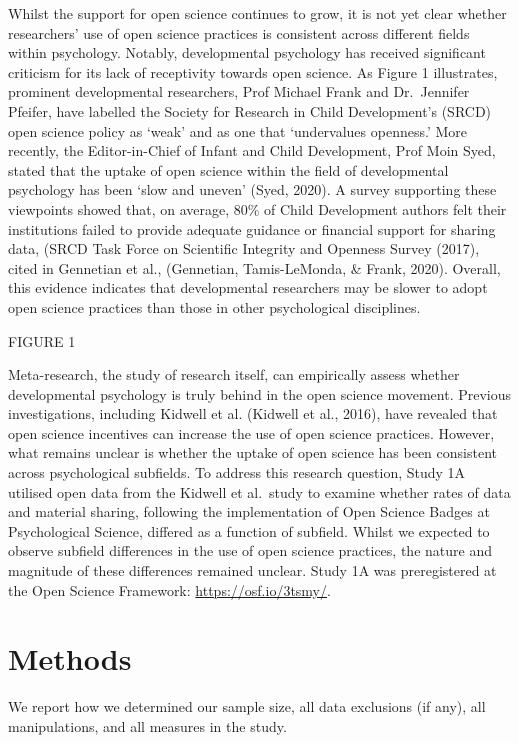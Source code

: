 \documentclass[
  english,
  man]{apa6}
\begin{document}
Whilst the support for open science continues to grow, it is not yet clear whether researchers' use of open science practices is consistent across different fields within psychology. Notably, developmental psychology has received significant criticism for its lack of receptivity towards open science. As Figure 1 illustrates, prominent developmental researchers, Prof Michael Frank and Dr.~Jennifer Pfeifer, have labelled the Society for Research in Child Development's (SRCD) open science policy as `weak' and as one that `undervalues openness.' More recently, the Editor-in-Chief of Infant and Child Development, Prof Moin Syed, stated that the uptake of open science within the field of developmental psychology has been `slow and uneven' (Syed, 2020). A survey supporting these viewpoints showed that, on average, 80\% of Child Development authors felt their institutions failed to provide adequate guidance or financial support for sharing data, (SRCD Task Force on Scientific Integrity and Openness Survey (2017), cited in Gennetian et al., (Gennetian, Tamis-LeMonda, \& Frank, 2020). Overall, this evidence indicates that developmental researchers may be slower to adopt open science practices than those in other psychological disciplines.

FIGURE 1

Meta-research, the study of research itself, can empirically assess whether developmental psychology is truly behind in the open science movement. Previous investigations, including Kidwell et al. (Kidwell et al., 2016), have revealed that open science incentives can increase the use of open science practices. However, what remains unclear is whether the uptake of open science has been consistent across psychological subfields. To address this research question, Study 1A utilised open data from the Kidwell et al.~study to examine whether rates of data and material sharing, following the implementation of Open Science Badges at Psychological Science, differed as a function of subfield. Whilst we expected to observe subfield differences in the use of open science practices, the nature and magnitude of these differences remained unclear. Study 1A was preregistered at the Open Science Framework: \url{https://osf.io/3tsmy/}.

\hypertarget{methods}{%
\section{Methods}\label{methods}}

We report how we determined our sample size, all data exclusions (if any), all manipulations, and all measures in the study.
\end{document}
